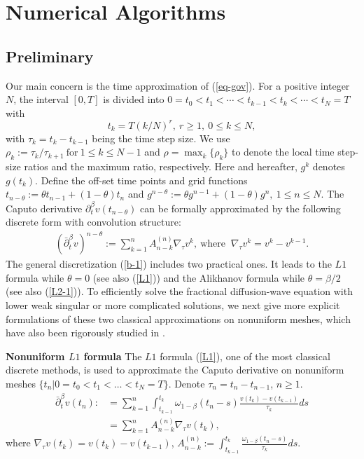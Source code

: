 \documentclass[11pt]{article}
\numberwithin{equation}{section}
\begin{document}
\section{Numerical Algorithms}\label{sec-na}
\subsection{Preliminary}
Our main concern is the time approximation of (\ref{eq-gov}). For a positive integer $N$, the interval $[0,T]$ is divided into $0=t_0<t_1<\cdots< t_{k-1}<t_k<\cdots<t_N=T$ with $$t_k=T(k/N)^r,~r\geq1,~0\leq k\leq N,$$ with $\tau_k=t_k-t_{k-1}$ being the time step size. We use $\rho_k:=\tau_k/\tau_{k+1} ~\mbox{for}~1\leq k\leq N-1$ and $\rho=\max_k\{\rho_k\}$ to denote the local time step-size ratios and the maximum ratio, respectively. Here and hereafter, $g^k$ denotes $g(t_k)$. Define the off-set time
points and grid functions
$t_{n-\theta}:= \theta t_{n-1}+(1-\theta)t_n$ and $g^{n-\theta}:= \theta g^{n-1}+(1-\theta)g^n,~1 \le n \le N$.
The Caputo derivative $\partial_t^\beta v(t_{n-\theta})$ can be formally approximated by the following discrete form with convolution structure:  
\begin{align}\label{b-1}
(\bar\partial_t^\beta v)^{n-\theta}:=\sum\limits_{k=1}^{n}A_{n-k}^{(n)}\nabla_{\tau}v^k,~\mbox{where }~\nabla_{\tau}v^k=v^k-v^{k-1}.    
\end{align}
The general discretization (\ref{b-1}) includes two practical ones. It leads to the $L1$ formula while
$\theta= 0$ (see also (\ref{L1})) and the Alikhanov formula while $\theta=\beta/2$ (see also (\ref{L2-1})). To efficiently solve the fractional diffusion-wave equation with lower weak singular or more complicated solutions, we next give more explicit formulations of these two classical approximations on nonuniform meshes, which have also been rigorously studied in \cite{LiaoH2018L1,LiaoH2021L2_1}.

\textbf{Nonuniform $L1$ formula} The $L1$ formula (\ref{L1}), one of the most classical discrete methods, is used to approximate the Caputo derivative on nonuniform meshes $\{t_n|0=t_0<t_1<\dots <t_N=T\}$. Denote $\tau_n=t_n-t_{n-1}$, $n\geq1$.
\begin{align}\nonumber
\bar\partial_t^\beta v(t_n)
:&= \sum_{k=1}^{n}\int_{t_{k-1}}^{t_k}\omega_{1-\beta}(t_n-s)\frac{v(t_k)-v(t_{k-1})}{\tau_k}ds\\ \label{L1}
&=\sum_{k=1}^nA_{n-k}^{(n)}\nabla_\tau v(t_k),
\end{align}
where $\nabla_\tau v(t_k)=v(t_k)-v(t_{k-1})$, $A_{n-k}^{(n)}:=\int_{t_{k-1}}^{t_k}\frac{\omega_{1-\beta}(t_n-s)}{\tau_k}ds$. 
\end{document}
